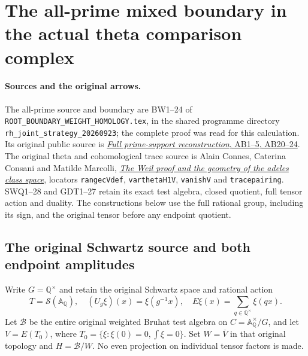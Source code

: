 \section{The all-prime mixed boundary in the actual theta comparison complex}
\label{sec:global-boundary-cone-lift}

\paragraph{Sources and the original arrows.}
The all-prime source and boundary are BW1--24 of
\nolinkurl{ROOT_BOUNDARY_WEIGHT_HOMOLOGY.tex}, in the shared
programme directory \texttt{rh\_joint\_strategy\_20260923}; the
complete proof was read for this calculation. Its original
public source is
\href{https://github.com/KokunoYumeto/zeta-function-research-reader/blob/3c78cfbd9e194d35117b33277c421c6564ce3dbf/workbenches/splitzero-tandem/continuations/20260923-full-prime-support/031/01_REBUILT_MATHEMATICS.tex}{\emph{Full prime-support reconstruction}, AB1--5, AB20--24}.
The original theta and cohomological trace source is Alain Connes,
Caterina Consani and Matilde Marcolli,
\href{https://arxiv.org/abs/math/0703392v1}{\emph{The Weil proof and
the geometry of the adeles class space}}, locators
\texttt{rangecVdef}, \texttt{varthetaH1V}, \texttt{vanishV} and
\texttt{tracepairing}. SWQ1--28 and GDT1--27 retain its exact
test algebra, closed quotient, full tensor action and duality.
The constructions below use the full rational group, including
its sign, and the original tensor before any endpoint quotient.

\subsection{The original Schwartz source and both endpoint amplitudes}

Write $G=\mathbb Q^\times$ and retain the original Schwartz space
and rational action
\begin{equation}\tag{GBC1}
 T=\mathcal S(\mathbb A_{\mathbb Q}),\quad
 (U_g\xi)(x)=\xi(g^{-1}x),\quad
 E\xi(x)=\sum_{q\in\mathbb Q^\times}\xi(qx).
\end{equation}
Let $\mathscr B$ be the entire original weighted Bruhat test
algebra on $C=\mathbb A_{\mathbb Q}^\times/G$, and let
$V=E(T_0)$, where $T_0=\{\xi:\xi(0)=0,\int\xi=0\}$.
Set $W=\overline V$ in that original topology and $H=\mathscr B/W$.
No even projection on individual tensor factors is made.

